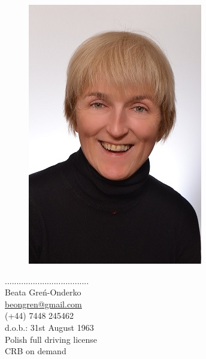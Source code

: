 \documentclass[a4paper,12pt,final]{memoir}
\newcommand{\Sep}{\vspace{1.5em}}
\newenvironment{Career Profile}
	{\ignorespaces\textbf{\color{ForestGreen} Career Profile}}
	{\Sep\ignorespacesafterend}
\newenvironment{Key experience}
	{\ignorespaces\textbf{\color{ForestGreen} Key experience}}
	{\Sep\ignorespacesafterend}
\begin{document}
%
\begin{figure}
	\hfill
	\includegraphics[width=1\columnwidth]{zeby.jpg}
	\vspace{-7cm}
\end{figure}

\begin{flushright}
	\small
	\color{White}....................................\\
	\Sep
	\color{Black}
	Beata Greń-Onderko \\
	\url{beongren@gmail.com}  \\
	(+44) 7448 245462\\
	d.o.b.: 31st August 1963\\
	Polish full driving license\\
	CRB on demand
\end{flushright}\normalsize
\framebreak
\end{document}
